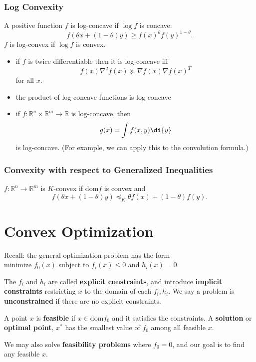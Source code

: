 \documentclass[11pt]{article}
\begin{document}
\subsubsection*{Log Convexity} 
A positive function $f$ is log-concave if $\log f$ is concave: 
\[ f(\theta x + (1-\theta) y) \geq f(x)^\theta f(y)^{1-\theta}. \] 
$f$ is log-convex if $\log f$ is convex. \par 

\begin{itemize}
    \item if $f$ is twice differentiable then it is log-concave iff 
    \[ f(x) \nabla^2f(x) \succeq \nabla f(x) \nabla f(x)^T \] 
    for all $x$. 
    \item the product of log-concave functions is log-concave 
    \item if $f: \mathbb{R}^n \times \mathbb{R}^m \rightarrow \mathbb{R}$ is log-concave, then 
    \[ g(x) = \int f(x, y) \di{y} \] 
    is log-concave. (For example, we can apply this to the convolution formula.)
\end{itemize}

\subsubsection*{Convexity with respect to Generalized Inequalities} 
$f: \mathbb{R}^n \rightarrow \mathbb{R}^m$ is $K$-convex if $\mathrm{dom} f$ is convex and 
\[ f(\theta x + (1-\theta)y) \preceq_K \theta f(x) + (1-\theta) f(y). \] 

\newpage 
\section{Convex Optimization} 
Recall: the general optimization problem has the form \\
minimize $f_0(x)$ subject to $f_i(x) \leq 0$ and $h_i(x) = 0$. \par 
The $f_i$ and $h_i$ are called \textbf{explicit constraints}, and introduce \textbf{implicit constraints} restricting $x$ to the domain of each $f_i, h_i$. We say a problem is \textbf{unconstrained} if there are no explicit constraints. \par 

A point $x$ is \textbf{feasible} if $x \in \mathrm{dom} f_0$ and it satisfies the constraints. A \textbf{solution} or \textbf{optimal point}, $x^*$ has the smallest value of $f_0$ among all feasible $x$. \par 
We may also solve \textbf{feasibility problems} where $f_0 = 0$, and our goal is to find any feasible $x$. \par 
\end{document}
